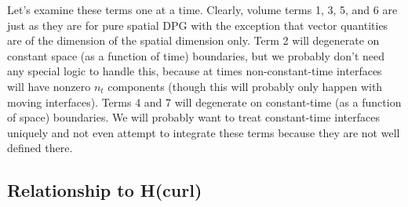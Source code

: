 \documentclass{article}
\begin{document}
Let's examine these terms one at a time. Clearly, volume terms 1, 3, 5, and 6
are just as they are for pure spatial DPG with the exception that vector
quantities are of the dimension of the spatial dimension only. Term 2 will
degenerate on constant space (as a function of time) boundaries, but
we probably don't need any special logic to handle this, because at times
non-constant-time interfaces will have nonzero $n_t$ components (though this
will probably only happen with moving interfaces).
Terms 4 and 7 will degenerate on constant-time (as a function of
space) boundaries. We will probably want to treat constant-time interfaces
uniquely and not even attempt to integrate these terms because they are not
well defined there.

\subsection*{Relationship to H(curl)}

\clearpage
\end{document}
